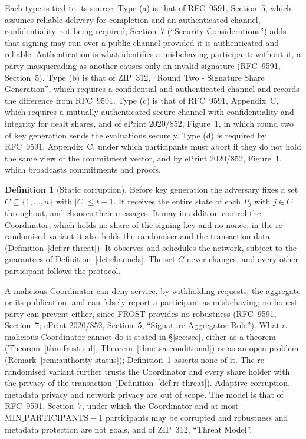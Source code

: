 \documentclass[11pt,a4paper]{article}
\theoremstyle{definition}
\newtheorem{definition}[theorem]{Definition}
\begin{document}
Each type is tied to its source. Type (a) is that of RFC~9591, Section~5,
which assumes reliable delivery for completion and an authenticated channel,
confidentiality not being required; Section~7 (``Security Considerations'')
adds that signing may run over a public channel provided it is authenticated
and reliable. Authentication is what identifies a misbehaving participant:
without it, a party masquerading as another causes only an invalid signature
(RFC~9591, Section~5). Type (b) is that of ZIP~312, ``Round Two - Signature
Share Generation'', which requires a confidential and authenticated channel
and records the difference from RFC~9591. Type (c) is that of RFC~9591,
Appendix~C, which requires a mutually authenticated secure channel with
confidentiality and integrity for dealt shares, and of ePrint 2020/852,
Figure~1, in which round two of key generation sends the evaluations securely.
Type (d) is required by RFC~9591, Appendix~C, under which participants must
abort if they do not hold the same view of the commitment vector, and by
ePrint 2020/852, Figure~1, which broadcasts commitments and proofs.

\begin{definition}[Static corruption]\label{def:corruption}
Before key generation the adversary fixes a set
\(C \subseteq \{1, \dots, n\}\) with \(\lvert C \rvert \le t - 1\). It
receives the entire state of each \(P_j\) with \(j \in C\) throughout, and
chooses their messages. It may in addition control the Coordinator, which
holds no share of the signing key and no nonce; in the re-randomised variant
it also holds the randomiser and the transaction data
(Definition~\ref{def:rr-threat}). It observes and schedules the network,
subject to the guarantees of Definition~\ref{def:channels}. The set \(C\)
never changes, and every other participant follows the protocol.
\end{definition}

A malicious Coordinator can deny service, by withholding requests, the
aggregate or its publication, and can falsely report a participant as
misbehaving; no honest party can prevent either, since FROST provides no
robustness (RFC~9591, Section~7; ePrint 2020/852, Section~5, ``Signature
Aggregator Role''). What a malicious Coordinator cannot do is stated in
\S\ref{sec:sec}, either as a theorem (Theorem~\ref{thm:frost-suf},
Theorem~\ref{thm:tsa-conditional}) or as an open problem
(Remark~\ref{rem:authority-status}); Definition~\ref{def:corruption}
asserts none of it. The re-randomised variant further trusts the
Coordinator and every share holder with the privacy of the transaction
(Definition~\ref{def:rr-threat}). Adaptive corruption, metadata privacy and
network privacy are out of scope. The model is that of RFC~9591,
Section~7, under which the Coordinator and at most
\(\mathrm{MIN\_PARTICIPANTS} - 1\) participants may be corrupted and
robustness and metadata protection are not goals, and of ZIP~312, ``Threat
Model''.
\end{document}
